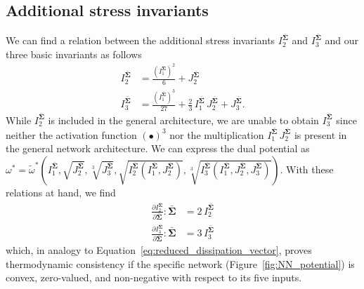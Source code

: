 \subsection{Additional stress invariants}
\label{app:stress_invars}
%
We can find a relation between the additional stress invariants $I_2^{\bar{\bm{\Sigma}}}$ and $I_3^{\bar{\bm{\Sigma}}}$ and our three basic invariants as follows
%
\begin{align}
    I_2^{\bar{\bm{\Sigma}}} &= \frac{\left(I_1^{\bar{\bm{\Sigma}}}\right)^2}{6} + J_2^{\bar{\bm{\Sigma}}} \\
    I_3^{\bar{\bm{\Sigma}}} &= \frac{\left(I_1^{\bar{\bm{\Sigma}}}\right)^3}{27} + \frac{2}{3}\, I_1^{\bar{\bm{\Sigma}}}\, J_2^{\bar{\bm{\Sigma}}} + J_3^{\bar{\bm{\Sigma}}}.
\end{align}
%
While $I_2^{\bar{\bm{\Sigma}}}$ is included in the general architecture, we are unable to obtain $I_3^{\bar{\bm{\Sigma}}}$ since neither the activation function $(\bullet)^3$ nor the multiplication $I_1^{\bar{\bm{\Sigma}}}\, J_2^{\bar{\bm{\Sigma}}}$ is present in the general network architecture.
We can express the dual potential as $\omega^*=\tilde{\omega}^*\left(I_1^{\bar{\bm{\Sigma}}}, \sqrt{J_2^{\bar{\bm{\Sigma}}}}, \sqrt[3]{J_3^{\bar{\bm{\Sigma}}}}, \sqrt{I_2^{\bar{\bm{\Sigma}}}(I_1^{\bar{\bm{\Sigma}}},J_2^{\bar{\bm{\Sigma}}} )}, \sqrt[3]{I_3^{\bar{\bm{\Sigma}}}(I_1^{\bar{\bm{\Sigma}}},J_2^{\bar{\bm{\Sigma}}},J_3^{\bar{\bm{\Sigma}}} )} \right)$.
With these relations at hand, we find
%
\begin{align}
    \frac{\partial I_2^{\bar{\bm{\Sigma}}}}{\partial \bar{\bm{\Sigma}}} : \bar{\bm{\Sigma}} &= 2\,I_2^{\bar{\bm{\Sigma}}} \\
    \frac{\partial I_3^{\bar{\bm{\Sigma}}}}{\partial \bar{\bm{\Sigma}}} : \bar{\bm{\Sigma}} &= 3\,I_3^{\bar{\bm{\Sigma}}}
\end{align}
%
which, in analogy to Equation~\eqref{eq:reduced_dissipation_vector}, proves thermodynamic consistency if the specific network (Figure~\ref{fig:NN_potential}) is convex, zero-valued, and non-negative with respect to its five inputs.